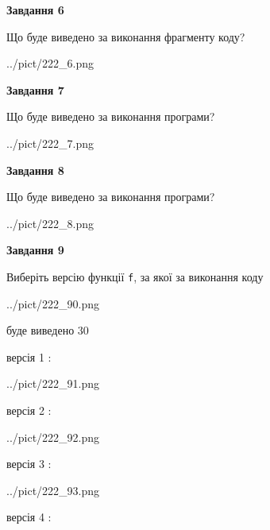 \documentclass[12pt, ukrainian]{article}
\def\code#1{\Verb!#1!}
\begin{document}
{\begin {large}
{\begin {center}\textbf{Завдання 6}\end {center}}

Що буде виведено за виконання фрагменту коду?\par
\begin{center}
	{../pict/222_6.png}
\end{center}
\newpage

{\begin {center}\textbf{Завдання 7}\end {center}}

Що буде виведено за виконання програми?\par
\begin{center}
	{../pict/222_7.png}
\end{center}
\newpage

{\begin {center}\textbf{Завдання 8}\end {center}}

Що буде виведено за виконання програми?\par
\begin{center}
	{../pict/222_8.png}
\end{center}
\newpage

{\begin {center}\textbf{Завдання 9}\end {center}}

Виберіть версію функції \code{f}, за якої за виконання коду
\begin{center}
	{../pict/222_90.png}
\end{center}
буде виведено 30

\vspace{5mm}
версія 1 :

\begin{center}
	{../pict/222_91.png}
\end{center}
версія 2 :

\begin{center}
	{../pict/222_92.png}
\end{center}
версія 3 :

\begin{center}
	{../pict/222_93.png}
\end{center}
версія 4 :


\end{large}}
\end{document}
